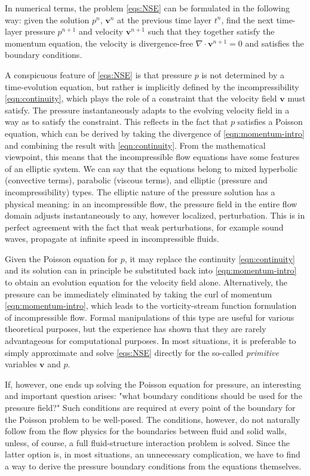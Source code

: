 \documentclass{article}
\numberwithin{equation}{section}
\begin{document}
In numerical terms, the problem \cref{eqs:NSE} can be formulated in the following way: given the solution $p^{n}$, $\boldsymbol{v}^{n}$ at the previous time layer $t^{n}$, find the next time-layer pressure $p^{n+1}$ and velocity $\boldsymbol{v}^{n+1}$ such that they together satisfy the momentum equation, the velocity is divergence-free $\nabla \cdot \boldsymbol{v}^{n+1} = 0$ and satisfies the boundary conditions.

A conspicuous feature of \cref{eqs:NSE} is that pressure $p$ is not determined by a time-evolution equation, but rather is implicitly defined by the incompressibility \cref{eqn:continuity}, which plays the role of a constraint that the velocity field $\boldsymbol{v}$ must satisfy. 
The pressure instantaneously adapts to the evolving velocity field in a way as to satisfy the constraint. 
This reflects in the fact that $p$ satisfies a Poisson equation, which can be derived by taking the divergence of \cref{eqn:momentum-intro} and combining the result with \cref{eqn:continuity}. 
From the mathematical viewpoint, this means that the incompressible flow equations have some features of an elliptic system. 
We can say that the equations belong to mixed hyperbolic (convective terms), parabolic (viscous terms), and elliptic (pressure and incompressibility) types. 
The elliptic nature of the pressure solution has a physical meaning: in an incompressible flow, the pressure field in the entire flow domain adjusts instantaneously to any, however localized, perturbation. 
This is in perfect agreement with the fact that weak perturbations, for example sound waves, propagate at infinite speed in incompressible fluids.

Given the Poisson equation for $p$, it may replace the continuity \cref{eqn:continuity} and its solution can in principle be substituted back into \cref{eqn:momentum-intro} to obtain an evolution equation for the velocity field alone. 
Alternatively, the pressure can be immediately eliminated by taking the $\mathrm{curl}$ of momentum \cref{eqn:momentum-intro}, which leads to the vorticity-stream function formulation of incompressible flow. 
Formal manipulations of this type are useful for various theoretical purposes, but the experience has shown that they are rarely advantageous for computational purposes. 
In most situations, it is preferable to simply approximate and solve \cref{eqs:NSE} directly for the so-called \textit{primitive} variables $\boldsymbol{v}$ and $p$.

If, however, one ends up solving the Poisson equation for pressure, an interesting and important question arises: "what boundary conditions should be used for the pressure field?" Such conditions are required at every point of the boundary for the Poisson problem to be well-posed. 
The conditions, however, do not naturally follow from the flow physics for the boundaries between fluid and solid walls, unless, of course, a full fluid-structure interaction problem is solved. 
Since the latter option is, in most situations, an unnecessary complication, we have to find a way to derive the pressure boundary conditions from the equations themselves.
\end{document}
